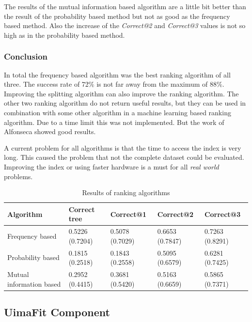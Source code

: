 \documentclass[11pt, accentcolor=tud9b, nochapname]{tudreport}
\begin{document}
The results of the mutual information based algorithm are a little bit better than the result of the probability based method but not as good as the frequency based method. Also the increase of the \emph{Correct@2} and \emph{Correct@3} values is not so high as in the probability based method.

\subsubsection{Conclusion}

In total the frequency based algorithm was the best ranking algorithm of all three. The success rate of 72\% is not far away from the maximum of 88\%. Improving the splitting algorithm can also improve the ranking algorithm. The other two ranking algorithm do not return useful results, but they can be used in combination with some other algorithm in a machine learning based ranking algorithm. Due to a time limit this was not implemented. But the work of  Alfonseca \cite{alf2008} showed good results.

A current problem for all algorithms is that the time to access the index is very long. This caused the problem that not the complete dataset could be evaluated. Improving the index or using faster hardware is a must for all \emph{real world} problems.

\begin{table}[h]
  \begin{center}
    \begin{tabular}{|l|l||l|l|l|}
      \hline
      \textbf{Algorithm} & \textbf{Correct tree} & \textbf{Correct@1} & \textbf{Correct@2} & \textbf{Correct@3} \\ \hline
     Frequency based & 0.5226  (0.7204) & 0.5078 (0.7029) & 0.6653 (0.7847) & 0.7263 (0.8291) \\ \hline
      Probability based & 0.1815  (0.2518) & 0.1843 (0.2558) & 0.5095 (0.6579) & 0.6281 (0.7425) \\ \hline
      Mutual information based & 0.2952 (0.4415) & 0.3681 (0.5420) & 0.5163 (0.6659) & 0.5865 (0.7371) \\ \hline
    \end{tabular}
  \end{center}
  \caption{Results of ranking algorithms}
\end{table}

\subsection{UimaFit Component}
\end{document}
